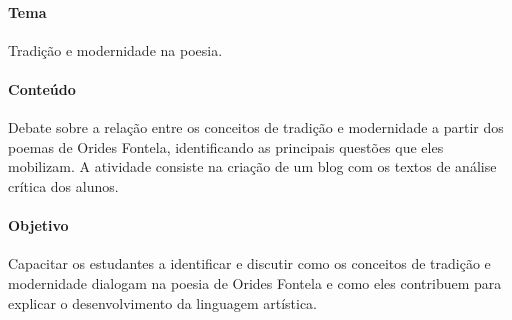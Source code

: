 \documentclass[12pt]{extarticle}
\begin{document}

\paragraph{Tema} Tradição e modernidade na poesia.

\paragraph{Conteúdo} Debate sobre a relação entre os conceitos de tradição
e modernidade a partir dos poemas de Orides Fontela, identificando as
principais questões que eles mobilizam. A atividade consiste na criação
de um blog com os textos de análise crítica dos alunos.

\paragraph{Objetivo} Capacitar os estudantes a identificar e discutir como
os conceitos de tradição e modernidade dialogam na poesia de Orides
Fontela e como eles contribuem para explicar o desenvolvimento da
linguagem artística.
\end{document}
